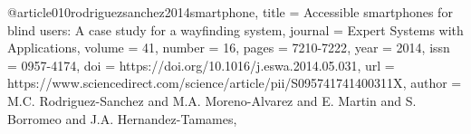 @article{010rodriguezsanchez2014smartphone,
title = {Accessible smartphones for blind users: A case study for a wayfinding system},
journal = {Expert Systems with Applications},
volume = {41},
number = {16},
pages = {7210-7222},
year = {2014},
issn = {0957-4174},
doi = {https://doi.org/10.1016/j.eswa.2014.05.031},
url = {https://www.sciencedirect.com/science/article/pii/S095741741400311X},
author = {M.C. Rodriguez-Sanchez and M.A. Moreno-Alvarez and E. Martin and S. Borromeo and J.A. Hernandez-Tamames},
}